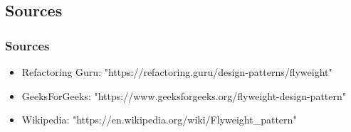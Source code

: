 \documentclass{beamer}
\begin{document}

\subsection{Sources}

\begin{frame}
\frametitle{Sources}
\begin{itemize}
    \item Refactoring Guru: "https://refactoring.guru/design-patterns/flyweight"
    \item GeeksForGeeks: "https://www.geeksforgeeks.org/flyweight-design-pattern"
    \item Wikipedia: "https://en.wikipedia.org/wiki/Flyweight\_pattern"
\end{itemize}

\end{frame}
\end{document}
